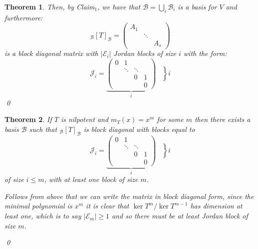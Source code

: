 \documentclass[11pt, a4paper]{report}
\makeatletter
\numberwithin{equation}{section}
\newcommand{\B}{\mathcal{B}}
\newcommand{\pmx}[1]{\begin{pmatrix}#1\end{pmatrix}}
\numberwithin{equation}{subsection}
\theoremstyle{plain}
\newtheorem{thm}{Theorem}[chapter] %
\theoremstyle{definition}
\theoremstyle{remark}
\newtheorem*{prf}{Proof}
\renewenvironment{prf}[1][\proofname]{\par
  \vspace{-\topsep}%
  \normalfont
  \topsep0pt \partopsep0pt %
  \trivlist
  \item[\hskip\labelsep
        \itshape
    #1\@addpunct{.}]\ignorespaces
}{%
  \popQED\endtrivlist\@endpefalse
  \addvspace{6pt plus 6pt} %
}
\newcommand{\pr}[1]{\begin{adjustwidth}{1cm}{} \begin{prf} #1 \end{prf} \end{adjustwidth}}
\makeatother
\begin{document}
\begin{thm}
{Then, by {\sc Claim}$_1$, we have that $\B = \bigcup_i \B_i$ is a basis for $V$ and furthermore:
$$_\B[T]_\B = \pmx{A_1 & & \\ & \ddots & \\ & & A_s}$$
is a block diagonal matrix with $|\mathcal{E}_i|$ Jordan blocks of size $i$ with the form:
$$\mathcal{J}_i = \underbrace{\pmx{0 & 1 & & \\ & \ddots & \ddots & \\ & & 0 & 1 \\ & & & 0}}_i \left. \begin{matrix}\\\\\\\\\end{matrix}\right\} i$$
}\vspace*{-8pt}\qed
\end{thm}
\vspace*{-8pt}
\begin{thm}
If $T$ is nilpotent and $m_T(x) = x^m$ for some $m$ then there exists a basis $\B$ such that $_\B[T]_\B$ is block diagonal with blocks equal to 
$$\mathcal{J}_i = \underbrace{\pmx{0 & 1 & & \\ & \ddots & \ddots & \\ & & 0 & 1 \\ & & & 0}}_i \left. \begin{matrix}\\\\\\\\\end{matrix}\right\} i$$
of size $i \leq m$, with at least one block of size $m$.

\pr{
Follows from above that we can write the matrix in block diagonal form, since the minimal polynomial is $x^m$ it is clear that $\ker T^m / \ker T^{m-1}$ has dimension at least one, which is to say $|\mathcal{E}_m| \geq 1$ and so there must be at least Jordan block of size $m$.
}\qed
\end{thm}
\end{document}
